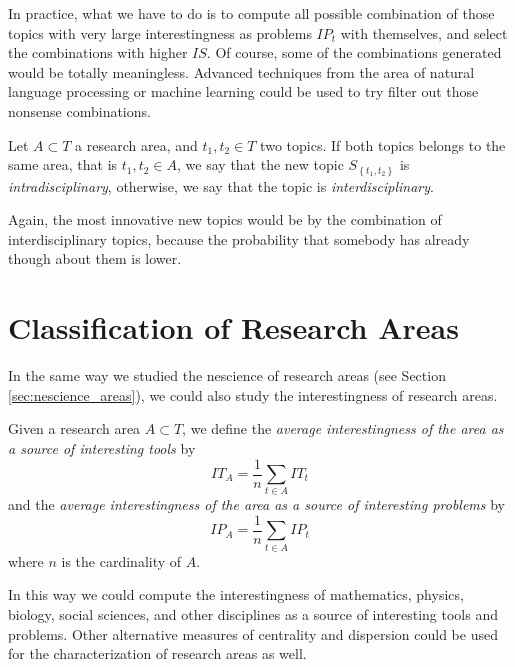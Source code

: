 In practice, what we have to do is to compute all possible combination of those topics with very large interestingness as problems $IP_{t}$ with themselves, and select the combinations with higher $IS$. Of course, some of the combinations generated would be totally meaningless. Advanced techniques from the area of natural language processing or machine learning could be used to try filter out those nonsense combinations.

\begin{definition} 
Let $A \subset T$ a research area, and $t_{1}, t_{2} \in T$ two topics. If both topics belongs to the same area, that is $t_{1}, t_{2} \in A$, we say that the new topic $S_{\left\{ t_{1},t_{2}\right\} }$ is \emph{intradisciplinary}, otherwise, we say that the topic is \emph{interdisciplinary}.
\end{definition}

Again, the most innovative new topics would be by the combination of interdisciplinary topics, because the probability that somebody has already though about them is lower.

%
%

\section{Classification of Research Areas}

In the same way we studied the nescience of research areas (see Section \ref{sec:nescience_areas}), we could also study the interestingness of research areas.

\begin{definition}
Given a research area $A\subset T$, we define the \emph{average interestingness
of the area as a source of interesting tools} by
\[
IT_{A}=\frac{1}{n}\sum_{t\in A}IT_{t}
\]
and the \emph{average interestingness of the area as a source of interesting
problems} by
\[
IP_{A}=\frac{1}{n}\sum_{t\in A}IP_{t}
\]
where $n$ is the cardinality of $A$.
\end{definition}

In this way we could compute the interestingness of mathematics, physics, biology, social sciences, and other disciplines as a source of interesting tools and problems. Other alternative measures of centrality and dispersion could be used for the characterization of research areas as well.

